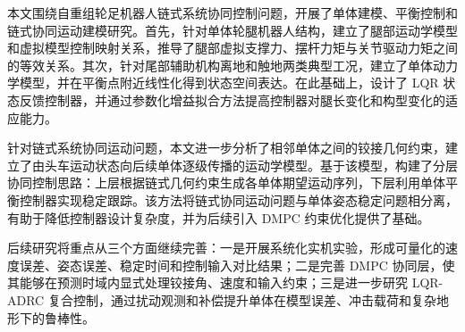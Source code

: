 
\begin{conclusion}

  本文围绕自重组轮足机器人链式系统协同控制问题，开展了单体建模、平衡控制和链式协同运动建模研究。首先，针对单体轮腿机器人结构，建立了腿部运动学模型和虚拟模型控制映射关系，推导了腿部虚拟支撑力、摆杆力矩与关节驱动力矩之间的等效关系。其次，针对尾部辅助机构离地和触地两类典型工况，建立了单体动力学模型，并在平衡点附近线性化得到状态空间表达。在此基础上，设计了 LQR 状态反馈控制器，并通过参数化增益拟合方法提高控制器对腿长变化和构型变化的适应能力。

  针对链式系统协同运动问题，本文进一步分析了相邻单体之间的铰接几何约束，建立了由头车运动状态向后续单体逐级传播的运动学模型。基于该模型，构建了分层协同控制思路：上层根据链式几何约束生成各单体期望运动序列，下层利用单体平衡控制器实现稳定跟踪。该方法将链式协同运动问题与单体姿态稳定问题相分离，有助于降低控制器设计复杂度，并为后续引入 DMPC 约束优化提供了基础。

  后续研究将重点从三个方面继续完善：一是开展系统化实机实验，形成可量化的速度误差、姿态误差、稳定时间和控制输入对比结果；二是完善 DMPC 协同层，使其能够在预测时域内显式处理铰接角、速度和输入约束；三是进一步研究 LQR-ADRC 复合控制，通过扰动观测和补偿提升单体在模型误差、冲击载荷和复杂地形下的鲁棒性。
\end{conclusion}
